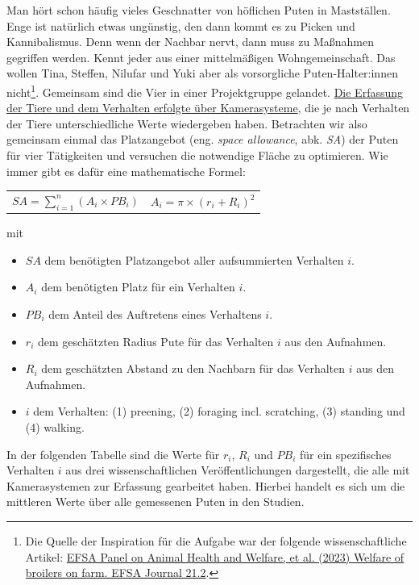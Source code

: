 \documentclass[a4paper, 9pt]{scrartcl}\usepackage[]{graphicx}\usepackage[]{xcolor}
\begin{document}
Man hört schon häufig vieles Geschnatter von höflichen Puten in Mastställen. Enge ist natürlich etwas ungünstig, den dann kommt es zu Picken und Kannibalismus. Denn wenn der Nachbar nervt, dann muss zu Maßnahmen gegriffen werden. Kennt jeder aus einer mittelmäßigen Wohngemeinschaft. Das wollen Tina, Steffen, Nilufar und Yuki aber als vorsorgliche Puten-Halter:innen nicht\footnote{Die Quelle der Inspiration für die Aufgabe war der folgende wissenschaftliche Artikel: \href{https://www.efsa.europa.eu/en/efsajournal/pub/7788}{EFSA Panel on Animal Health and Welfare, et al. (2023) Welfare of broilers on farm. EFSA Journal 21.2}.}. Gemeinsam sind die Vier in einer Projektgruppe gelandet. \uline{Die Erfassung der Tiere und dem Verhalten erfolgte über Kamerasysteme}, die je nach Verhalten der Tiere unterschiedliche Werte wiedergeben haben. Betrachten wir also gemeinsam einmal das Platzangebot (eng. \textit{space allowance}, abk. \textit{SA}) der Puten für vier Tätigkeiten und versuchen die notwendige Fläche zu optimieren. Wie immer gibt es dafür eine mathematische Formel:

\begin{center}
  \begin{tabular}{cc}
    $SA = \sum^n_{i = 1} (A_i \times PB_i)$ & $A_i = \pi \times (r_i + R_i)^2$\\
  \end{tabular}
\end{center}

\vspace{-2Ex}

mit

\begin{itemize}[noitemsep]
\item $SA$ dem benötigten Platzangebot aller aufsummierten Verhalten $i$.
\item $A_i$ dem benötigten Platz für ein Verhalten $i$. 
\item $PB_i$ dem Anteil des Auftretens eines Verhaltens $i$.
\item $r_i$ dem geschätzten Radius Pute für das Verhalten $i$ aus den Aufnahmen.
\item $R_i$ dem geschätzten Abstand zu den Nachbarn für das Verhalten $i$ aus den Aufnahmen.    
\item $i$ dem Verhalten: (1) preening, (2) foraging incl. scratching, (3)
  standing und (4) walking.
\end{itemize}

In der folgenden Tabelle sind die Werte für $r_i$, $R_i$ und $PB_i$ für ein spezifisches Verhalten $i$ aus drei wissenschaftlichen Veröffentlichungen dargestellt, die alle mit Kamerasystemen zur Erfassung gearbeitet haben. Hierbei handelt es sich um die mittleren Werte über alle gemessenen Puten in den Studien.
\end{document}
